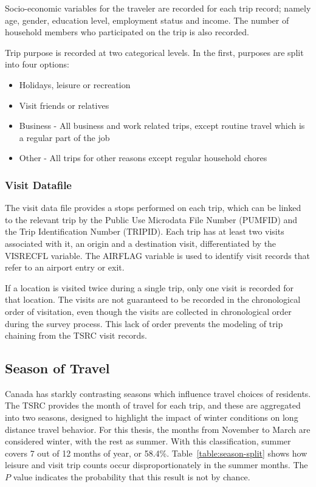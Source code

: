 Socio-economic variables for the traveler are recorded for each trip record; namely age, gender, education level, employment status and income. The number of household members who participated on the trip is also recorded.

Trip purpose is  recorded at two categorical levels. In the first, purposes are split into four options:
\begin{itemize}
\item Holidays, leisure or recreation
\item Visit friends or relatives
\item Business - All business and work related trips, except routine travel which is a regular part of the job
\item Other - All trips for other reasons except regular household chores
\end{itemize}

\subsubsection*{Visit Datafile}
The visit data file provides a stops performed on each trip, which can be linked to the relevant trip by the Public Use Microdata File Number (PUMFID) and the Trip Identification Number (TRIPID). Each trip has at least two visits associated with it, an origin and a destination visit, differentiated by the VISRECFL variable. The AIRFLAG variable is used to identify visit records that refer to an airport entry or exit. 

If a location is visited twice during a single trip, only one visit is recorded for that location. The visits are not guaranteed to be recorded in the chronological order of visitation, even though the visits are collected in chronological order during the survey process. This lack of order prevents the modeling of trip chaining from the TSRC visit records.

\subsection{Season of Travel}
Canada has starkly contrasting seasons which influence travel choices of residents. The TSRC provides the month of travel for each trip, and these are aggregated into two seasons, designed to highlight the impact of winter conditions on long distance travel behavior. For this thesis, the months from November to March are considered winter, with the rest as summer. With this classification, summer covers 7 out of 12 months of year, or 58.4\%. Table~\ref{table:season-split} shows how leisure and visit trip counts occur disproportionately in the summer months. The $P$ value indicates the probability that this result is not by chance.

